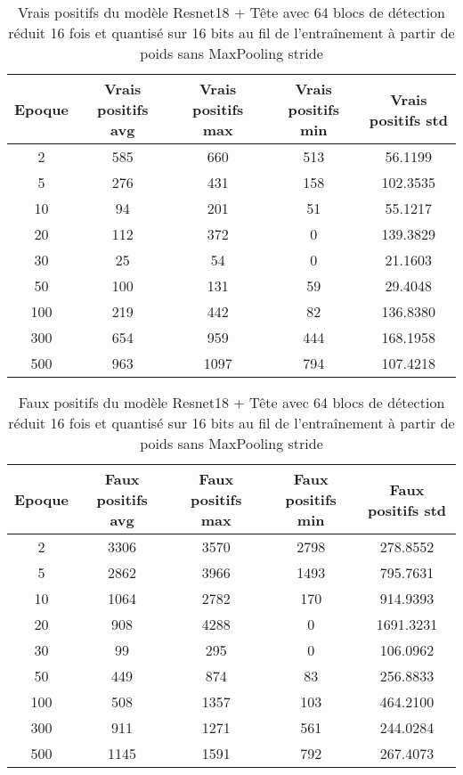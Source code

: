 \begin{table}[!ht]
    \caption{Vrais positifs du modèle Resnet18 + Tête avec 64 blocs de détection réduit 16 fois et quantisé sur 16 bits au fil de l'entraînement à partir de poids sans MaxPooling stride}
    \label{tab:qresnet18+head_64n_reduced_16x_true_positive_16b_from_weights_wo_maxpool_stride}
    \centering
    \begin{tabular}{ |c||c|c|c|c|  }
        \hline
        \rowcolor{gray!50}
        Epoque & Vrais positifs avg & Vrais positifs max & Vrais positifs min & Vrais positifs std\\
        \hline
        2 & 585 & 660 & 513 & 56.1199\\
        5 & 276 & 431 & 158 & 102.3535\\
        10 & 94 & 201 & 51 & 55.1217\\
        20 & 112 & 372 & 0 & 139.3829\\
        30 & 25 & 54 & 0 & 21.1603\\
        50 & 100 & 131 & 59 & 29.4048\\
        100 & 219 & 442 & 82 & 136.8380\\
        300 & 654 & 959 & 444 & 168.1958\\
        500 & 963 & 1097 & 794 & 107.4218\\
        \hline
    \end{tabular}
\end{table}

\begin{table}[!ht]
    \caption{Faux positifs du modèle Resnet18 + Tête avec 64 blocs de détection réduit 16 fois et quantisé sur 16 bits au fil de l'entraînement à partir de poids sans MaxPooling stride}
    \label{tab:qresnet18+head_64n_reduced_16x_false_positive_16b_from_weights_wo_maxpool_stride}
    \centering
    \begin{tabular}{ |c||c|c|c|c|  }
        \hline
        \rowcolor{gray!50}
        Epoque & Faux positifs avg & Faux positifs max & Faux positifs min & Faux positifs std\\
        \hline
        2 & 3306 & 3570 & 2798 & 278.8552\\
        5 & 2862 & 3966 & 1493 & 795.7631\\
        10 & 1064 & 2782 & 170 & 914.9393\\
        20 & 908 & 4288 & 0 & 1691.3231\\
        30 & 99 & 295 & 0 & 106.0962\\
        50 & 449 & 874 & 83 & 256.8833\\
        100 & 508 & 1357 & 103 & 464.2100\\
        300 & 911 & 1271 & 561 & 244.0284\\
        500 & 1145 & 1591 & 792 & 267.4073\\
        \hline
    \end{tabular}
\end{table}


